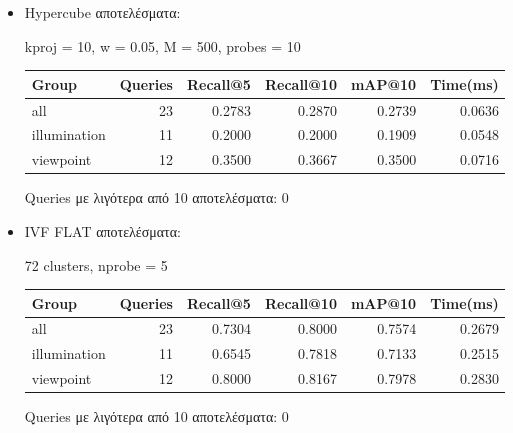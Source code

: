 \documentclass [conference]{IEEEtran}
\begin{document}
\begin{itemize}
    \item Hypercube αποτελέσματα:
    \begin{table}[H]
    \centering
    \small
    \setlength{\tabcolsep}{3pt}
    kproj = 10, w = 0.05, M = 500, probes = 10
    \par\smallskip
    \begin{tabular}{l r r r r r}
    \hline
    \textbf{Group} & \textbf{Queries} & \textbf{Recall@5} & \textbf{Recall@10} & \textbf{mAP@10} & \textbf{Time(ms)} \\
    \hline
    all & 23 & 0.2783 & 0.2870 & 0.2739 & 0.0636 \\
    illumination & 11 & 0.2000 & 0.2000 & 0.1909 & 0.0548 \\
    viewpoint & 12 & 0.3500 & 0.3667 & 0.3500 & 0.0716 \\
    \hline
    \end{tabular}
    \par\smallskip
    \footnotesize Queries με λιγότερα από 10 αποτελέσματα: 0
    \end{table}


    \item IVF FLAT αποτελέσματα:
    \begin{table}[H]
    \centering
    \small
    \setlength{\tabcolsep}{3pt}
    72 clusters, nprobe = 5
    \par\smallskip
    \begin{tabular}{l r r r r r}
    \hline
    \textbf{Group} & \textbf{Queries} & \textbf{Recall@5} & \textbf{Recall@10} & \textbf{mAP@10} & \textbf{Time(ms)} \\
    \hline
    all & 23 & 0.7304 & 0.8000 & 0.7574 & 0.2679 \\
    illumination & 11 & 0.6545 & 0.7818 & 0.7133 & 0.2515 \\
    viewpoint & 12 & 0.8000 & 0.8167 & 0.7978 & 0.2830 \\
    \hline
    \end{tabular}
    \par\smallskip
    \footnotesize Queries με λιγότερα από 10 αποτελέσματα: 0
    \end{table}

        

\end{itemize}
\end{document}
